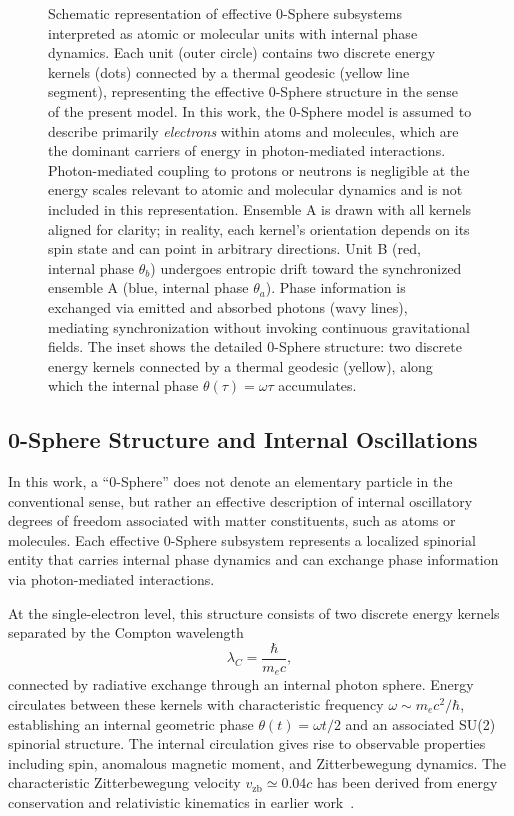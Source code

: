 \documentclass[
 reprint,
 amsmath,amssymb,
 aps,
 prb,
]{revtex4-2}
\numberwithin{equation}{section}
\begin{document}
\begin{figure}[t!]
\centering 

\caption{\justifying
Schematic representation of effective 0-Sphere subsystems interpreted as atomic or molecular units with internal phase dynamics. Each unit (outer circle) contains two discrete energy kernels (dots) connected by a thermal geodesic (yellow line segment), representing the effective 0-Sphere structure in the sense of the present model. In this work, the 0-Sphere model is assumed to describe primarily \textit{electrons} within atoms and molecules, which are the dominant carriers of energy in photon-mediated interactions. Photon-mediated coupling to protons or neutrons is negligible at the energy scales relevant to atomic and molecular dynamics and is not included in this representation. Ensemble A is drawn with all kernels aligned for clarity; in reality, each kernel's orientation depends on its spin state and can point in arbitrary directions. Unit B (red, internal phase $\theta_b$) undergoes entropic drift toward the synchronized ensemble A (blue, internal phase $\theta_a$). Phase information is exchanged via emitted and absorbed photons (wavy lines), mediating synchronization without invoking continuous gravitational fields. The inset shows the detailed 0-Sphere structure: two discrete energy kernels connected by a thermal geodesic (yellow), along which the internal phase $\theta(\tau) = \omega \tau$ accumulates.
}
\label{fig:entrainment}
\end{figure}

\subsection{0-Sphere Structure and Internal Oscillations}

In this work, a ``0-Sphere'' does not denote an elementary particle in the conventional sense, but rather an effective description of internal oscillatory degrees of freedom associated with matter constituents, such as atoms or molecules. Each effective 0-Sphere subsystem represents a localized spinorial entity that carries internal phase dynamics and can exchange phase information via photon-mediated interactions.

At the single-electron level, this structure consists of two discrete energy kernels separated by the Compton wavelength
\begin{equation}
\lambda_C = \frac{\hbar}{m_e c},
\label{eq:compton_wavelength}
\end{equation}
connected by radiative exchange through an internal photon sphere. Energy circulates between these kernels with characteristic frequency $\omega \sim m_e c^2/\hbar$, establishing an internal geometric phase $\theta(t) = \omega t/2$ and an associated SU(2) spinorial structure. The internal circulation gives rise to observable properties including spin, anomalous magnetic moment, and Zitterbewegung dynamics. The characteristic Zitterbewegung velocity $v_\text{zb} \simeq 0.04c$ has been derived from energy conservation and relativistic kinematics in earlier work~\cite{Hanamura2024Quantum}.
\end{document}
